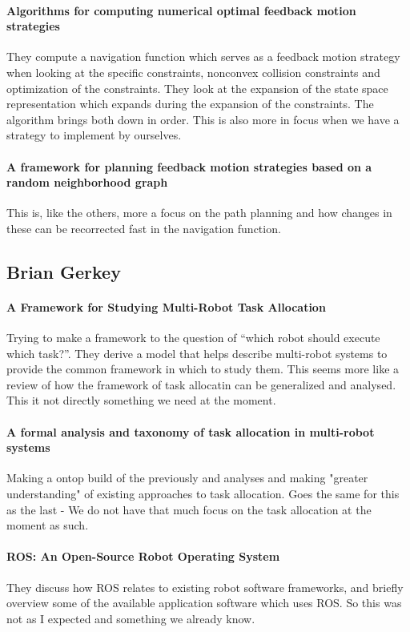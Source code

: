 \paragraph{Algorithms for computing numerical optimal feedback motion strategies}
They compute a navigation function which serves as a feedback motion strategy when looking at the specific constraints, nonconvex collision constraints and optimization of the constraints. They look at the expansion of the state space representation which expands during the expansion of the constraints. The algorithm brings both down in order.
This is also more in focus when we have a strategy to implement by ourselves.

\paragraph{A framework for planning feedback motion strategies based on a random neighborhood graph}
This is, like the others, more a focus on the path planning and how changes in these can be recorrected fast in the navigation function.


\subsection{Brian Gerkey}

{\vskip0pt\color{gray}
\paragraph{A Framework for Studying Multi-Robot Task Allocation}
Trying to make a framework to the question of “which robot should execute which task?”. They derive a model that helps describe multi-robot systems to provide the common framework in which to study them.
This seems more like a review of how the framework of task allocatin can be generalized and analysed. This it not directly something we need at the moment.}

\paragraph{A formal analysis and taxonomy of task allocation in multi-robot systems}
Making a ontop build of the previously and analyses and making "greater understanding" of existing approaches to task allocation.
Goes the same for this as the last - We do not have that much focus on the task allocation at the moment as such.

\paragraph{ROS: An Open-Source Robot Operating System}
They discuss how ROS relates to existing robot software frameworks, and briefly overview some of the available application software which uses ROS.
So this was not as I expected and something we already know.

